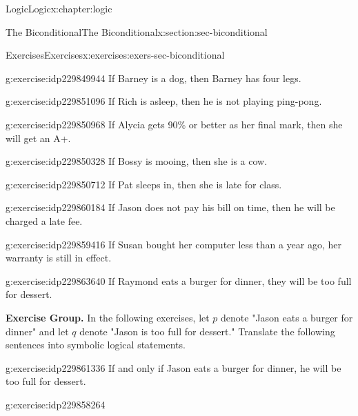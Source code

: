 \documentclass[twoside,10pt,]{book}
\numberwithin{equation}{section}
\begin{document}
\begin{chapterptx}{Logic}{}{Logic}{}{}{x:chapter:logic}
\begin{sectionptx}{The Biconditional}{}{The Biconditional}{}{}{x:section:sec-biconditional}
\begin{exercises-subsection}{Exercises}{}{Exercises}{}{}{x:exercises:exers-sec-biconditional}
\begin{exercisegroup}
\begin{divisionexerciseeg}{19}{}{}{g:exercise:idp229849944}%
If Barney is a dog, then Barney has four legs.\end{divisionexerciseeg}%
\begin{divisionexerciseeg}{20}{}{}{g:exercise:idp229851096}%
If Rich is asleep, then he is not playing ping-pong.\end{divisionexerciseeg}%
\begin{divisionexerciseeg}{21}{}{}{g:exercise:idp229850968}%
If Alycia gets 90\% or better as her final mark, then she will get an A+.\end{divisionexerciseeg}%
\begin{divisionexerciseeg}{22}{}{}{g:exercise:idp229850328}%
If Bossy is mooing, then she is a cow.\end{divisionexerciseeg}%
\begin{divisionexerciseeg}{23}{}{}{g:exercise:idp229850712}%
If Pat sleeps in, then she is late for class.\end{divisionexerciseeg}%
\begin{divisionexerciseeg}{24}{}{}{g:exercise:idp229860184}%
If Jason does not pay his bill on time, then he will be charged a late fee.\end{divisionexerciseeg}%
\begin{divisionexerciseeg}{25}{}{}{g:exercise:idp229859416}%
If Susan bought her computer less than a year ago, her warranty is still in effect.\end{divisionexerciseeg}%
\begin{divisionexerciseeg}{26}{}{}{g:exercise:idp229863640}%
If Raymond eats a burger for dinner, they will be too full for dessert.\end{divisionexerciseeg}%
\end{exercisegroup}
\par\medskip\noindent
\par\medskip\noindent%
\textbf{Exercise Group.}\space\space%
In the following exercises, let \(p\) denote "Jason eats a burger for dinner" and let \(q\) denote "Jason is too full for dessert."  Translate the following sentences into symbolic logical statements.\begin{exercisegroup}
\begin{divisionexerciseeg}{27}{}{}{g:exercise:idp229861336}%
If and only if Jason eats a burger for dinner, he will be too full for dessert.\end{divisionexerciseeg}%
\begin{divisionexerciseeg}{28}{}{}{g:exercise:idp229858264}%

\end{divisionexerciseeg}
\end{exercisegroup}
\end{exercises-subsection}
\end{sectionptx}
\end{chapterptx}
\end{document}
